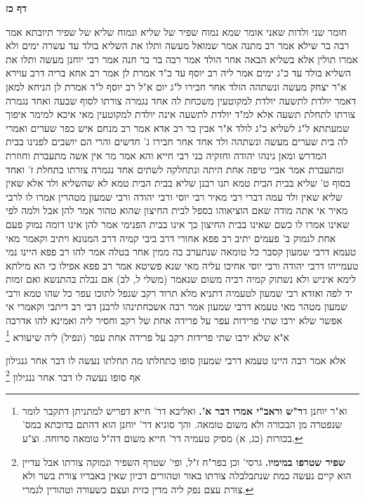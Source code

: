 \documentclass[12pt, openany]{book}
\newcommand{\sethebfont}{
\fontsize{10.5pt}{21.0pt} \selectfont
}
\newcommand{\twocol}[1]{
	{\sethebfont \begin{multicols}{2}
			#1
	\end{multicols}}	
}
\newcommand{\sectname}{}
\newcommand{\newsection}[1]{
	\addcontentsline{toc}{section}{#1}
	\renewcommand{\sectname}{#1}	
	\vspace{-\baselineskip}
	\begin{center}
		\textbf{%
\fontsize{16pt}{16pt}\selectfont
			#1}
	\end{center}
	\vspace{-\baselineskip}
	\nopagebreak
}
\newcommand{\footnotecomment}[1]{\footnote{#1}}
\newcommand{\commenta}[1]{\footnotecomment{#1}}
\begin{document}
\newsection{דף כז}
\twocol{חומר שני ולדות שאני אומר  שמא נמוח שפיר של שליא ונמוח שליא של שפיר  תיובתא 
אמר רבה בר שילא אמר רב מתנה אמר שמואל  מעשה ותלו את השליא בולד עד עשרה ימים ולא אמרו תולין אלא בשליא הבאה אחר הולד 
אמר רבה בר בר חנה אמר רבי יוחנן  מעשה ותלו את השליא בולד עד כ"ג ימים  אמר ליה רב יוסף עד כ"ד אמרת לן 
אמר רב אחא בריה דרב עוירא א"ר יצחק  מעשה ונשתהה הולד אחר חבירו ל"ג יום  א"ל רב יוסף  ל"ד אמרת לן 
הניחא למאן דאמר יולדת לתשעה יולדת למקוטעין משכחת לה  אחד נגמרה צורתו לסוף שבעה ואחד נגמרה צורתו לתחלת תשעה  אלא למ"ד יולדת לתשעה אינה יולדת למקוטעין מאי איכא למימר 
איפוך שמעתתא  ל"ג לשליא כ"ג לולד 
א"ר אבין בר רב אדא אמר רב מנחם איש כפר שערים  ואמרי לה בית שערים מעשה ונשתהה ולד אחד אחר חבירו ג' חדשים והרי הם יושבים לפנינו בבית המדרש  ומאן נינהו  יהודה וחזקיה בני רבי חייא 
והא אמר מר  אין אשה מתעברת וחוזרת ומתעברת  אמר אביי  טיפה אחת היתה ונתחלקה לשתים אחד נגמרה צורתו בתחלת ז' ואחד בסוף ט'
שליא בבית הבית טמא תנו רבנן  שליא בבית הבית טמא  לא שהשליא ולד אלא שאין שליא שאין ולד עמה דברי רבי מאיר  רבי יוסי ורבי יהודה ורבי שמעון מטהרין 
אמרו לו לרבי מאיר  אי אתה מודה שאם הוציאוהו בספל לבית החיצון שהוא טהור  אמר להן  אבל  ולמה לפי שאינו 
אמרו לו  כשם שאינו בבית החיצון כך אינו בבית הפנימי  אמר להן  אינו דומה נמוק פעם אחת לנמוק ב' פעמים 
יתיב רב פפא אחורי דרב ביבי קמיה דרב המנונא ויתיב וקאמר  מאי טעמא דרבי שמעון קסבר כל טומאה שנתערב בה ממין אחר בטלה 
אמר להו רב פפא  היינו נמי טעמייהו דרבי יהודה ורבי יוסי  אחיכו עליה  מאי שנא  פשיטא 
אמר רב פפא  אפילו כי הא מילתא לימא איניש ולא נשתוק קמיה רביה משום שנאמר (משלי ל, לב) אם נבלת בהתנשא ואם זמות יד לפה 
ואזדא רבי שמעון לטעמיה דתניא  מלא תרוד רקב שנפל לתוכו עפר כל שהו טמא ורבי שמעון מטהר 
מאי טעמא דרבי שמעון  אמר רבה אשכחתינהו לרבנן דבי רב דיתבי וקאמרי  אי אפשר שלא ירבו שתי פרידות עפר על פרידה אחת של רקב וחסיר ליה 
ואמינא להו  אדרבה א"א שלא ירבו שתי פרידות רקב על
פרידה אחת עפר (ונפיל) ליה שיעורא 
\commenta{וא"ר יוחנן ד\textbf{ר"ש וראב"י אמרו דבר א'.}  ואליבא דר' חייא דפריש למתניתן דתקבר לומר שנפטרה מן הבכורה ולא משום טומאה. והך סוגיא דר' יוחנן הוא דהתם בדוכתא במס' בכורות (כג, א) מסיק טעמיה דר' חייא משום דה"ל טומאה סרוחה. וצ"ע. }

אלא אמר רבה  היינו טעמא דרבי שמעון סופו כתחלתו מה תחלתו נעשה לו דבר אחר גנגילון אף סופו נעשה לו דבר אחר גנגילון 
\commenta{\textbf{שפיר שטרפו במימיו.}  גרסי' וכן בפר"ח ז"ל, ופי' שטרף השפיר ונמוקה צורתו אבל עדיין הוא קיים נעשה כמת שנתבלבלה צורתו באור וטהורים דכיון שאין באבריו צורת בשר ולא צורת עצם נפק ליה מדין כזית ועצם כשעורה וטהורין לגמרי. }

}
\end{document}
